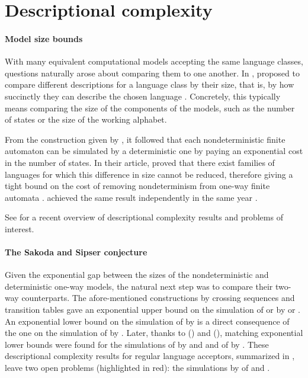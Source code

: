 \section{Descriptional complexity}\label{sec:context-descrcomp}

\paragraph{Model size bounds} With many equivalent computational models accepting the same language classes, questions naturally arose about comparing them to one another.
In \citeyear{MeyFis71}, \citeauthor{MeyFis71} proposed to compare different descriptions for a language class by their size, that is, by how succinctly they can describe the chosen language \cite{MeyFis71}.
Concretely, this typically means comparing the size of the components of the models, such as the number of states or the size of the working alphabet.

From the construction given by \citeauthor{RabSco59}, it followed that each nondeterministic finite automaton can be simulated by a deterministic one by paying an exponential cost in the number of states.
In their article, \citeauthor{MeyFis71} proved that there exist families of languages for which this difference in size cannot be reduced, therefore giving a tight bound on the cost of removing nondeterminism from one-way finite automata \cite{MeyFis71}.
\citeauthor{Moo71} achieved the same result independently in the same year \cite{Moo71}.

See \cite{KutMor+21} for a recent overview of descriptional complexity results and problems of interest.

\paragraph{The Sakoda and Sipser conjecture} Given the exponential gap between the sizes of the nondeterministic and deterministic one-way models, the natural next step was to compare their two-way counterparts.
The afore-mentioned constructions by crossing sequences \cite{RabSco59} and transition tables \cite{She59} gave an exponential upper bound on the simulation of \TNFA or \TDFA by \ONFA or \ODFA.
An exponential lower bound on the simulation of \TNFA by \ODFA is a direct consequence of the one on the simulation of \ONFA by \ODFA.
Later, thanks to \citeauthor{Bir93} (\citeyear{Bir93}) and \citeauthor{Kap05} (\citeyear{Kap05}), matching exponential lower bounds were found for the simulations of \TDFA by \ONFA and \ODFA and of \TNFA by \ONFA \cite{Bir93,Kap05}.
These descriptional complexity results for regular language acceptors, summarized in , leave two open problems (highlighted in red): the simulations by \TDFA of \TNFA and \ONFA.

